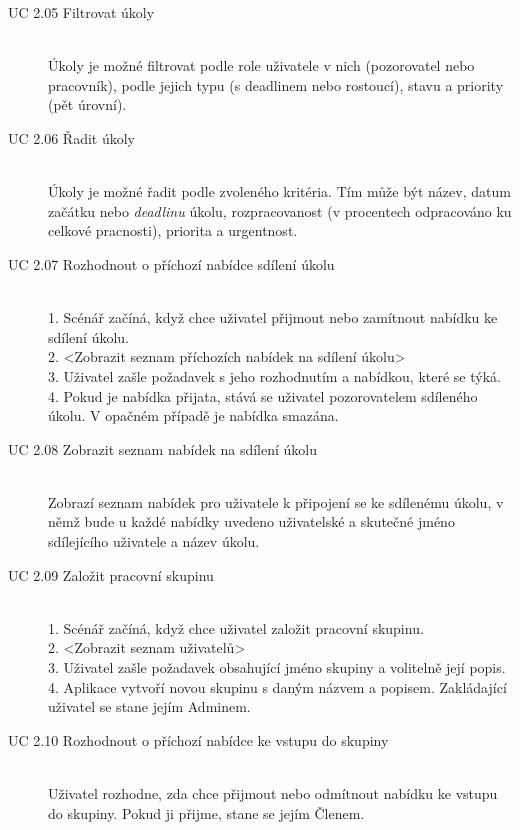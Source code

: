 \documentclass[thesis=B,czech]{FITthesis}[2012/06/26]
\begin{document}
\begin{description}
				\item[UC 2.05 Filtrovat úkoly] \hfill \\
					Úkoly je možné filtrovat podle role uživatele v nich (pozorovatel nebo pracovník), podle jejich typu (s deadlinem nebo rostoucí), stavu a priority (pět úrovní).
					
				\item[UC 2.06 Řadit úkoly] \hfill \\
					Úkoly je možné řadit podle zvoleného kritéria. Tím může být název, datum začátku nebo \textit{deadlinu} úkolu, rozpracovanost (v procentech odpracováno ku celkové pracnosti), priorita a urgentnost.
				
				\item[UC 2.07 Rozhodnout o příchozí nabídce sdílení úkolu] \hfill \\
					1. Scénář začíná, když chce uživatel přijmout nebo zamítnout nabídku ke sdílení úkolu. \\
					2. <Zobrazit seznam příchozích nabídek na sdílení úkolu> \\
					3. Uživatel zašle požadavek s jeho rozhodnutím a nabídkou, které se týká. \\
					4. Pokud je nabídka přijata, stává se uživatel pozorovatelem sdíleného úkolu. V opačném případě je nabídka smazána. \\
				
				\item[UC 2.08 Zobrazit seznam nabídek na sdílení úkolu] \hfill \\
					Zobrazí seznam nabídek pro uživatele k připojení se ke sdílenému úkolu, v němž bude u každé nabídky uvedeno uživatelské a skutečné jméno sdílejícího uživatele a název úkolu.
				
				\item[UC 2.09 Založit pracovní skupinu] \hfill \\
					1. Scénář začíná, když chce uživatel založit pracovní skupinu. \\
					2. <Zobrazit seznam uživatelů> \\
					3. Uživatel zašle požadavek obsahující jméno skupiny a volitelně její popis. \\
					4. Aplikace vytvoří novou skupinu s daným názvem a popisem. Zakládající uživatel se stane jejím Adminem. \\
					
				\item[UC 2.10 Rozhodnout o příchozí nabídce ke vstupu do skupiny] \hfill \\
					Uživatel rozhodne, zda chce přijmout nebo odmítnout nabídku ke vstupu do skupiny. Pokud ji přijme, stane se jejím Členem.
					

\end{description}
\end{document}
